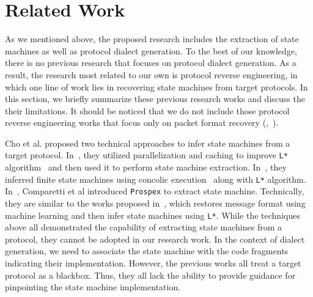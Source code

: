 \section{Related Work}
\label{sec:literature}

As we mentioned above, the proposed research includes the extraction of state
machines as well as protocol dialect generation. To the best of our knowledge,
there is no previous research that focuses on protocol dialect generation. As a
result, the research most related to our own is protocol reverse engineering, in
which one line of work lies in recovering state machines from target protocols.
In this section, we briefly summarize these previous research works and discuss
the their limitations. It should be noticed that we do not include those
protocol reverse engineering works that focus only on packet format recovery
(\eg,~\citep{AutoFormat, Polyglot, Dispatcher, ucsb-packet, wangzhi, Junghee,
Junghee2,Junghee3,Discoverer,Tupni}).

Cho et al. proposed two technical approaches to infer state machines from a
target protocol. In~\citep{botnet-inference}, they utilized parallelization  and
caching to improve \texttt{L*} algorithm~\citep{L1, L2} and then used it to
perform state machine  extraction. In~\citep{MACE}, they inferred finite state
machines using concolic execution~\citep{dart,cute}  along with \texttt{L*}
algorithm. In~\citep{Prospex}, Comparetti et al introduced \texttt{Prospex} to
extract state machine. Technically, they are similar to the works proposed
in~\citep{botnet-inference, MACE}, which restores message format using machine
learning and then infer state machines using \texttt{L*}. While the techniques
above all demonstrated the capability of extracting state machines from a
protocol, they cannot be adopted in our research work. In the context of dialect
generation, we need to associate the state machine with the code fragments
indicating their implementation. However, the previous works all treat a target
protocol as a blackbox. Thus, they all lack the ability to provide guidance for
pinpointing the state machine implementation.